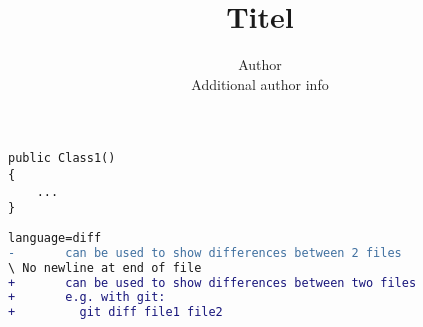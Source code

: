 \documentclass[12pt]{article}
\title{Titel} %
\author{Author\\Additional author info}
\begin{document}
%
\maketitle

\tableofcontents
\newpage
\section{}
\begin{lstlisting}[caption=Class1.cs]
public Class1()
{
    ...
}
\end{lstlisting}

\begin{lstlisting}[language=diff, caption=Diff.cs]
language=diff
-       can be used to show differences between 2 files
\ No newline at end of file
+       can be used to show differences between two files
+       e.g. with git:
+         git diff file1 file2
\end{lstlisting}
\end{document}
